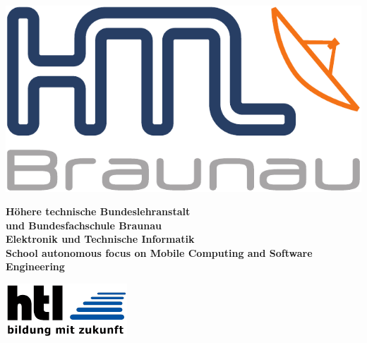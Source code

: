 
\pagebreak
\thispagestyle{empty}


\begin{minipage}[c]{0.20\linewidth}
\includegraphics[width=0.8\linewidth]{media/images/htl_c_cmyk_rein}
\end{minipage}
\begin{minipage}[c]{0.6\linewidth}
\begin{center}
{\bfseries\sffamily\large Höhere  technische  Bundeslehranstalt\\
und  Bundesfachschule  Braunau\\
Elektronik und Technische Informatik\\
{\normalsize School autonomous focus on Mobile Computing and Software Engineering} }
\end{center}
\end{minipage}
\begin{minipage}[c]{0.2\linewidth}
\hfill \includegraphics[width=0.8\linewidth]{media/images/htl-bildung-mit-zukunft}
\end{minipage}\\

\vspace{1em}

